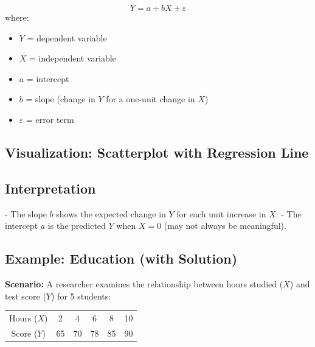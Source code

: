 \documentclass[11pt]{article}
\begin{document}
\[
Y = a + bX + \varepsilon
\]
where:
\begin{itemize}
    \item $Y$ = dependent variable
    \item $X$ = independent variable
    \item $a$ = intercept
    \item $b$ = slope (change in $Y$ for a one-unit change in $X$)
    \item $\varepsilon$ = error term
\end{itemize}

\subsection*{Visualization: Scatterplot with Regression Line}
\begin{center}
\end{center}

\subsection{Interpretation}

- The slope $b$ shows the expected change in $Y$ for each unit increase in $X$.
- The intercept $a$ is the predicted $Y$ when $X=0$ (may not always be meaningful).

\subsection{Example: Education (with Solution)}

\textbf{Scenario:} A researcher examines the relationship between hours studied ($X$) and test score ($Y$) for 5 students:

\begin{tabular}{c|ccccc}
Hours ($X$) & 2 & 4 & 6 & 8 & 10 \\
Score ($Y$) & 65 & 70 & 78 & 85 & 90 \\
\end{tabular}
\end{document}
